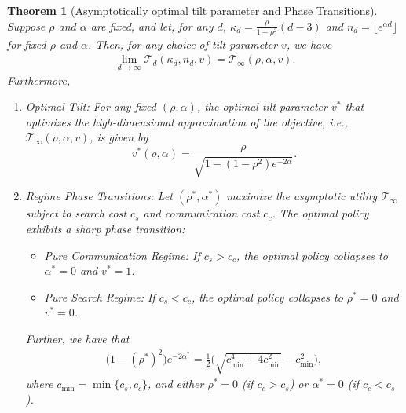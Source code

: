 \documentclass[12pt]{article}
\newtheorem{theorem}{Theorem}
\theoremstyle{definition}
\theoremstyle{remark}
\begin{document}
\begin{theorem} [Asymptotically optimal tilt parameter and Phase Transitions]
\label{thm:tilt}
Suppose $\rho$ and $\alpha$ are fixed, and let, for any $d$, $\kappa_d = \frac{\rho}{1-\rho^2}(d-3)$ and $n_d = \lfloor e^{\alpha d} \rfloor$ for fixed $\rho$ and $\alpha$. Then, for any choice of tilt parameter $v$, we have
\begin{align*}
    \lim_{d\rightarrow \infty} \mathcal{T}_d(\kappa_d ,n_d, v) = \mathcal{T}_{\infty} (\rho,\alpha,v).
\end{align*}
Furthermore,
\begin{enumerate}
    \item \emph{Optimal Tilt:} For any fixed $(\rho, \alpha)$, the optimal tilt parameter $v^*$ that optimizes the high-dimensional approximation of the objective, i.e., $\mathcal{T}_{\infty} (\rho,\alpha,v)$, is given
    by
    \begin{equation}
    \label{eq:opt_tilt}
        v^*(\rho, \alpha) = \frac{\rho}{\sqrt{1 - (1-\rho^2) e^{-2\alpha}}}.
    \end{equation}
    \item \emph{Regime Phase Transitions:} Let $(\rho^*, \alpha^*)$ maximize the asymptotic utility $\mathcal{T}_{\infty}$ subject to search cost $c_s$ and communication cost $c_c$. The optimal policy exhibits a sharp phase transition:
\begin{itemize}
    \item \emph{Pure Communication Regime:} If $c_s > c_c$, the optimal policy collapses to $\alpha^* = 0$ and $v^* = 1$.
    \item \emph{Pure Search Regime:} If $c_s < c_c$, the optimal policy collapses to $\rho^* = 0$ and $v^* = 0$.
\end{itemize}
Further, we have that
\begin{align}
\label{eq:rho_alpha_under_tilt}
   \big(1-(\rho^*)^2\big)e^{-2\alpha^*} =
   \frac{1}{2}  \Big( \sqrt{c_{\min}^4+ 4 c_{\min}^2} -c_{\min}^2 \Big),
\end{align}
where $c_{\min} = \min\{c_s , c_c\}$, and  either $\rho^* = 0$ (if $c_c > c_s$) or $\alpha^* = 0$ (if $c_c < c_s$).
\end{enumerate}
\end{theorem}
\end{document}
